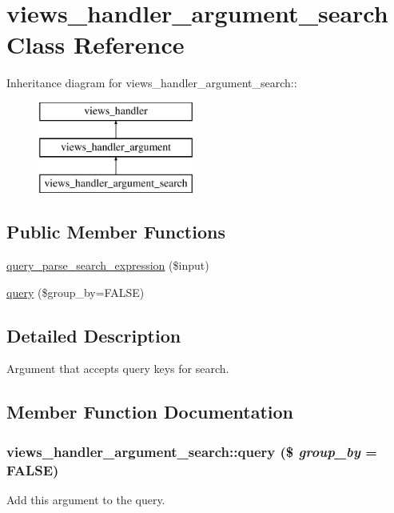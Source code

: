 \hypertarget{classviews__handler__argument__search}{
\section{views\_\-handler\_\-argument\_\-search Class Reference}
\label{classviews__handler__argument__search}
}
Inheritance diagram for views\_\-handler\_\-argument\_\-search::\begin{figure}[H]
\begin{center}
\leavevmode
\includegraphics[height=3cm]{classviews__handler__argument__search}
\end{center}
\end{figure}
\subsection*{Public Member Functions}
\begin{DoxyCompactItemize}
\item 
\hyperlink{classviews__handler__argument__search_ad44b53922da6f75b7371457ddb9a99c8}{query\_\-parse\_\-search\_\-expression} (\$input)
\item 
\hyperlink{classviews__handler__argument__search_a6760db3786242bb40df768e66d63436f}{query} (\$group\_\-by=FALSE)
\end{DoxyCompactItemize}


\subsection{Detailed Description}
Argument that accepts query keys for search. 

\subsection{Member Function Documentation}
\hypertarget{classviews__handler__argument__search_a6760db3786242bb40df768e66d63436f}{
\subsubsection[{query}]{\setlength{\rightskip}{0pt plus 5cm}views\_\-handler\_\-argument\_\-search::query (\$ {\em group\_\-by} = {\ttfamily FALSE})}}
\label{classviews__handler__argument__search_a6760db3786242bb40df768e66d63436f}
Add this argument to the query. 

